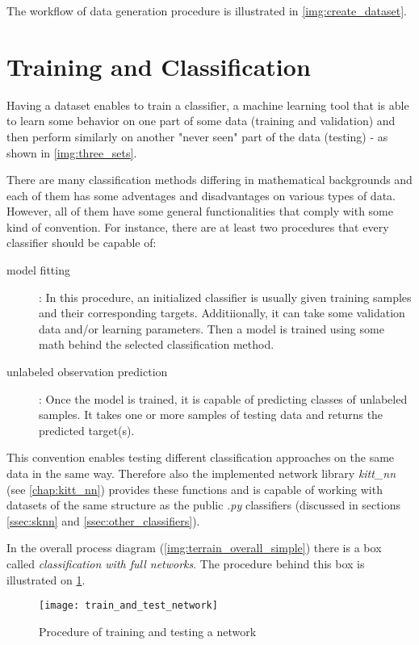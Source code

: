 The workflow of data generation procedure is illustrated in \cref{img:create_dataset}. 

\section{Training and Classification} \label{sec:training_and_classification}
Having a dataset enables to train a classifier, a machine learning tool that is able to learn some behavior on one part of some data (training and validation) and then perform similarly on another "never seen" part of the data (testing) - as shown in \cref{img:three_sets}.

There are many classification methods differing in mathematical backgrounds and each of them has some adventages and disadvantages on various types of data. However, all of them have some general functionalities that comply with some kind of convention. For instance, there are at least two procedures that every classifier should be capable of:

\begin{description}
\item[model fitting] : In this procedure, an initialized classifier is usually given training samples and their corresponding targets. Additiionally, it can take some validation data and/or learning parameters. Then a model is trained using some math behind the selected classification method.
\item[unlabeled observation prediction] : Once the model is trained, it is capable of predicting classes of unlabeled samples. It takes one or more samples of testing data and returns the predicted target(s).
\end{description}

This convention enables testing different classification approaches on the same data in the same way. Therefore also the implemented network library \textit{kitt\_nn} (see \cref{chap:kitt_nn}) provides these functions and is capable of working with datasets of the same structure as the public \textit{.py} classifiers (discussed in sections \ref{ssec:sknn} and \ref{ssec:other_classifiers}).

In the overall process diagram (\cref{img:terrain_overall_simple}) there is a box called \textit{classification with full networks}. The procedure behind this box is illustrated on \cref{img:train_and_test_network}.

\begin{figure}[H]
  \centering
  \texttt{[image: train\_and\_test\_network]}
  \caption{Procedure of training and testing a network}
  \label{img:train_and_test_network}
\end{figure}


